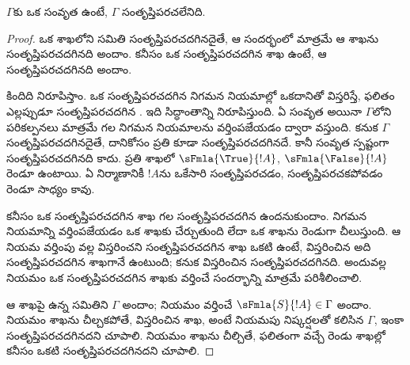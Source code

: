 \documentclass[../../../include/open-logic-section]{subfiles}
\begin{document}
\begin{thm}[నిర్దుష్టత]
  $\Gamma$కు ఒక సంవృత  ఉంటే, $\Gamma$
  సంతృప్తిపరచలేనిది.
\end{thm}

\begin{proof}
ఒక  శాఖలోని  సమితి
సంతృప్తిపరచదగినదైతే, ఆ సందర్భంలో మాత్రమే ఆ శాఖను
సంతృప్తిపరచదగినది అందాం. కనీసం ఒక సంతృప్తిపరచదగిన శాఖ ఉంటే,
ఆ  సంతృప్తిపరచదగినది అందాం.

కిందిది నిరూపిస్తాం. ఒక సంతృప్తిపరచదగిన  నిగమన
నియమాల్లో ఒకదానితో విస్తరిస్తే, ఫలితం ఎల్లప్పుడూ
సంతృప్తిపరచదగిన . ఇది సిద్ధాంతాన్ని నిరూపిస్తుంది.
ఏ సంవృత  అయినా $\Gamma$లోని పరికల్పనలు మాత్రమే గల
 నిగమన నియమాలను వర్తింపజేయడం ద్వారా వస్తుంది. కనుక
$\Gamma$ సంతృప్తిపరచదగినదైతే, దానికోసం ప్రతి  కూడా
సంతృప్తిపరచదగినదే. కానీ సంవృత  స్పష్టంగా
సంతృప్తిపరచదగినది కాదు. ప్రతి శాఖలో $\sFmla{\True}{!A}$,
$\sFmla{\False}{!A}$ రెండూ ఉంటాయి. ఏ నిర్మాణానికీ $!A$ను ఒకేసారి
సంతృప్తిపరచడం, సంతృప్తిపరచకపోవడం రెండూ సాధ్యం కావు.

కనీసం ఒక సంతృప్తిపరచదగిన శాఖ గల సంతృప్తిపరచదగిన 
ఉందనుకుందాం. నిగమన నియమాన్ని వర్తింపజేయడం ఒక శాఖకు
 చేర్చుతుంది లేదా ఒక శాఖను రెండుగా చీలుస్తుంది. ఆ నియమ
వర్తింపు వల్ల విస్తరించని సంతృప్తిపరచదగిన శాఖ ఒకటి 
ఉంటే, విస్తరించిన  అది సంతృప్తిపరచదగిన శాఖగానే
ఉంటుంది; కనుక విస్తరించిన  సంతృప్తిపరచదగినది. అందువల్ల నియమం
ఒక సంతృప్తిపరచదగిన శాఖకు వర్తించే సందర్భాన్ని మాత్రమే పరిశీలించాలి.

ఆ శాఖపై ఉన్న  సమితిని $\Gamma$ అందాం; నియమం
వర్తించే  $\sFmla{S}{!A} \in \Gamma$ అందాం.
నియమం శాఖను చీల్చకపోతే, విస్తరించిన శాఖ, అంటే నియమపు నిష్కర్షలతో
కలిసిన $\Gamma$, ఇంకా సంతృప్తిపరచదగినదని చూపాలి. నియమం శాఖను
చీల్చితే, ఫలితంగా వచ్చే రెండు శాఖల్లో కనీసం ఒకటి
సంతృప్తిపరచదగినదని చూపాలి.


\end{proof}
\end{document}
